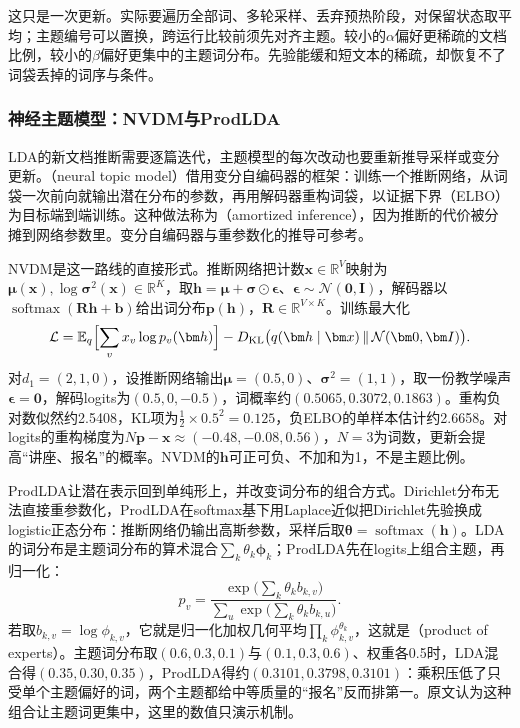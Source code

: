 这只是一次更新。实际要遍历全部词、多轮采样、丢弃预热阶段，对保留状态取平均；主题编号可以置换，跨运行比较前须先对齐主题。较小的$\alpha$偏好更稀疏的文档比例，较小的$\beta$偏好更集中的主题词分布。先验能缓和短文本的稀疏，却恢复不了词袋丢掉的词序与条件。

\subsubsection{神经主题模型：NVDM与ProdLDA}
\label{sec:nlp-classification-neural-topic}

LDA的新文档推断需要逐篇迭代，主题模型的每次改动也要重新推导采样或变分更新。（neural topic model）借用变分自编码器的框架：训练一个推断网络，从词袋一次前向就输出潜在分布的参数，再用解码器重构词袋，以证据下界（ELBO）为目标端到端训练。这种做法称为（amortized inference），因为推断的代价被分摊到网络参数里。变分自编码器与重参数化的推导可参考。

NVDM是这一路线的直接形式。推断网络把计数$\bm x\in\mathbb R^{V}$映射为$\bm\mu(\bm x),\log\bm\sigma^2(\bm x)\in\mathbb R^{K}$，取$\bm h=\bm\mu+\bm\sigma\odot\bm\epsilon$、$\bm\epsilon\sim\mathcal N(\bm0,\bm I)$，解码器以$\operatorname{softmax}(\bm R\bm h+\bm b)$给出词分布$\bm p(\bm h)$，$\bm R\in\mathbb R^{V\times K}$。训练最大化
\[
 \mathcal L=\mathbb E_q\Bigl[\sum_vx_v\log p_v(\bm h)\Bigr]
 -D_{\mathrm{KL}}\bigl(q(\bm h\mid\bm x)\,\|\,\mathcal N(\bm0,\bm I)\bigr).
\]
对$d_1=(2,1,0)$，设推断网络输出$\bm\mu=(0.5,0)$、$\bm\sigma^2=(1,1)$，取一份教学噪声$\bm\epsilon=\bm0$，解码logits为$(0.5,0,-0.5)$，词概率约$(0.5065,0.3072,0.1863)$。重构负对数似然约2.5408，KL项为$\frac12\times0.5^2=0.125$，负ELBO的单样本估计约2.6658。对logits的重构梯度为$N\bm p-\bm x\approx(-0.48,-0.08,0.56)$，$N=3$为词数，更新会提高“讲座、报名”的概率。NVDM的$\bm h$可正可负、不加和为1，不是主题比例。

ProdLDA让潜在表示回到单纯形上，并改变词分布的组合方式。Dirichlet分布无法直接重参数化，ProdLDA在softmax基下用Laplace近似把Dirichlet先验换成logistic正态分布：推断网络仍输出高斯参数，采样后取$\bm\theta=\operatorname{softmax}(\bm h)$。LDA的词分布是主题词分布的算术混合$\sum_k\theta_k\bm\phi_k$；ProdLDA先在logits上组合主题，再归一化：
\[
 p_v=\frac{\exp\bigl(\sum_k\theta_kb_{k,v}\bigr)}{\sum_u\exp\bigl(\sum_k\theta_kb_{k,u}\bigr)}.
\]
若取$b_{k,v}=\log\phi_{k,v}$，它就是归一化加权几何平均$\prod_k\phi_{k,v}^{\theta_k}$，这就是（product of experts）。主题词分布取$(0.6,0.3,0.1)$与$(0.1,0.3,0.6)$、权重各0.5时，LDA混合得$(0.35,0.30,0.35)$，ProdLDA得约$(0.3101,0.3798,0.3101)$：乘积压低了只受单个主题偏好的词，两个主题都给中等质量的“报名”反而排第一。原文认为这种组合让主题词更集中，这里的数值只演示机制。


